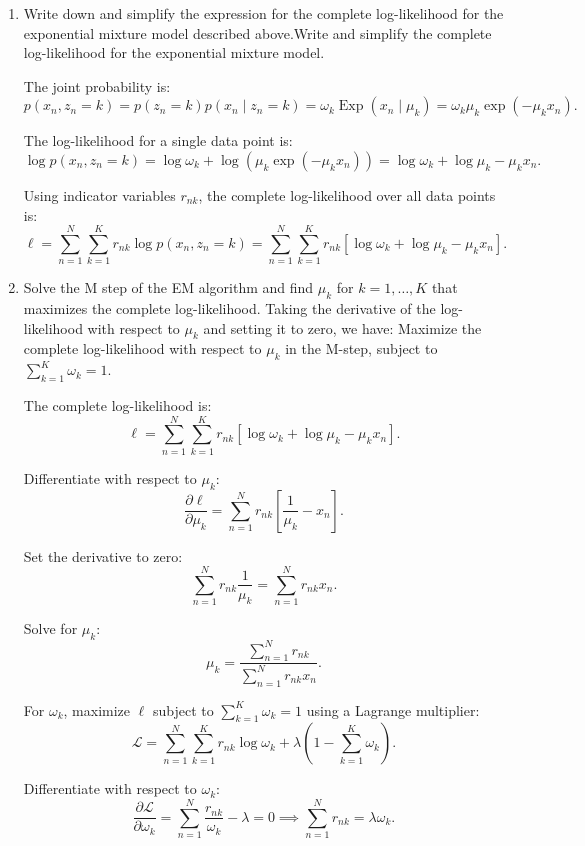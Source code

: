 \documentclass[a3paper,12pt]{extarticle} %
\begin{document}
\begin{enumerate}
    \item Write down and simplify the expression for the complete log-likelihood for the exponential
    mixture model described above.Write and simplify the complete log-likelihood for the exponential mixture model.

    The joint probability is:
    \[
    p(x_n, z_n = k) = p(z_n = k) p(x_n \mid z_n = k) = \omega_k \operatorname{Exp}(x_n \mid \mu_k) = \omega_k \mu_k \exp(-\mu_k x_n).
    \]
    
    The log-likelihood for a single data point is:
    \[
    \log p(x_n, z_n = k) = \log \omega_k + \log (\mu_k \exp(-\mu_k x_n)) = \log \omega_k + \log \mu_k - \mu_k x_n.
    \]
    
    Using indicator variables $r_{nk}$, the complete log-likelihood over all data points is:
    \[
    \ell = \sum_{n=1}^N \sum_{k=1}^K r_{nk} \log p(x_n, z_n = k) = \sum_{n=1}^N \sum_{k=1}^K r_{nk} \left[ \log \omega_k + \log \mu_k - \mu_k x_n \right].
    \]
   \item  Solve the M step of the EM algorithm and find $\mu_k$ for $k = 1, \ldots, K$ that maximizes the complete log-likelihood. Taking the derivative of the log-likelihood with respect to $\mu_k$ and setting it to zero, we have:
   Maximize the complete log-likelihood with respect to $\mu_k$ in the M-step, subject to $\sum_{k=1}^K \omega_k = 1$.

   The complete log-likelihood is:
   \[
   \ell = \sum_{n=1}^N \sum_{k=1}^K r_{nk} \left[ \log \omega_k + \log \mu_k - \mu_k x_n \right].
   \]
   
   Differentiate with respect to $\mu_k$:
   \[
   \frac{\partial \ell}{\partial \mu_k} = \sum_{n=1}^N r_{nk} \left[ \frac{1}{\mu_k} - x_n \right].
   \]
   
   Set the derivative to zero:
   \[
   \sum_{n=1}^N r_{nk} \frac{1}{\mu_k} = \sum_{n=1}^N r_{nk} x_n.
   \]
   
   Solve for $\mu_k$:
   \[
   \mu_k = \frac{\sum_{n=1}^N r_{nk}}{\sum_{n=1}^N r_{nk} x_n}.
   \]
   
   For $\omega_k$, maximize $\ell$ subject to $\sum_{k=1}^K \omega_k = 1$ using a Lagrange multiplier:
   \[
   \mathcal{L} = \sum_{n=1}^N \sum_{k=1}^K r_{nk} \log \omega_k + \lambda \left( 1 - \sum_{k=1}^K \omega_k \right).
   \]
   
   Differentiate with respect to $\omega_k$:
   \[
   \frac{\partial \mathcal{L}}{\partial \omega_k} = \sum_{n=1}^N \frac{r_{nk}}{\omega_k} - \lambda = 0 \implies \sum_{n=1}^N r_{nk} = \lambda \omega_k.
   \]
   

\end{enumerate}
\end{document}
